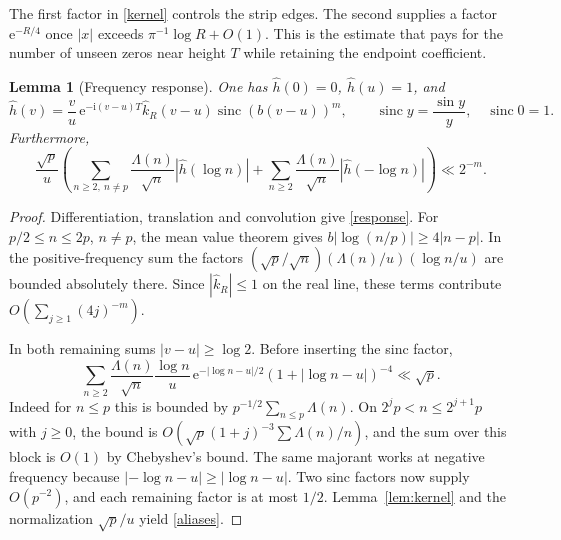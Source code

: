 \documentclass[11pt]{article}
\newtheorem{lemma}[theorem]{Lemma}
\newcommand{\ee}{\mathrm e}
\newcommand{\ii}{\mathrm i}
\newcommand{\wh}{\widehat}
\newcommand{\sinc}{\operatorname{sinc}}
\begin{document}
The first factor in \eqref{kernel} controls the strip edges. The second supplies a factor $\ee^{-R/4}$ once $|x|$ exceeds $\pi^{-1}\log R+O(1)$. This is the estimate that pays for the number of unseen zeros near height $T$ while retaining the endpoint coefficient.

\begin{lemma}[Frequency response]\label{lem:freq}
One has $\wh h(0)=0$, $\wh h(u)=1$, and
\begin{equation}\label{response}
 \wh h(v)=\frac vu\,\ee^{-\ii (v-u)T}\wh k_R(v-u)\sinc(b(v-u))^m,
 \qquad \sinc y=\frac{\sin y}{y},\quad\sinc 0=1.
\end{equation}
Furthermore,
\begin{equation}\label{aliases}
 \frac{\sqrt p}{u}
 \left(\sum_{n\ge2,\ n\ne p}\frac{\Lambda(n)}{\sqrt n}|\wh h(\log n)|
       +\sum_{n\ge2}\frac{\Lambda(n)}{\sqrt n}|\wh h(-\log n)|\right)
 \ll 2^{-m}.
\end{equation}
\end{lemma}
\begin{proof}
Differentiation, translation and convolution give \eqref{response}.
For $p/2\le n\le2p$, $n\ne p$, the mean value theorem gives
$b|\log(n/p)|\ge4|n-p|$. In the positive-frequency sum the factors
$(\sqrt p/\sqrt n)(\Lambda(n)/u)(\log n/u)$ are bounded absolutely there.
Since $|\wh k_R|\le1$ on the real line, these terms contribute
$O(\sum_{j\ge1}(4j)^{-m})$.

In both remaining sums $|v-u|\ge\log2$. Before inserting the sinc factor,
\[
 \sum_{n\ge2}\frac{\Lambda(n)}{\sqrt n}
 \frac{\log n}{u}\,\ee^{-|\log n-u|/2}(1+|\log n-u|)^{-4}\ll\sqrt p.
\]
Indeed for $n\le p$ this is bounded by $p^{-1/2}\sum_{n\le p}\Lambda(n)$.
On $2^jp<n\le2^{j+1}p$ with $j\ge0$, the bound is
$O(\sqrt p(1+j)^{-3}\sum\Lambda(n)/n)$, and the sum over this block is $O(1)$ by Chebyshev's bound. The same majorant works at negative frequency because $|{-\log n}-u|\ge|\log n-u|$. Two sinc factors now supply $O(p^{-2})$, and each remaining factor is at most $1/2$. Lemma~\ref{lem:kernel} and the normalization $\sqrt p/u$ yield \eqref{aliases}.
\end{proof}
\end{document}
